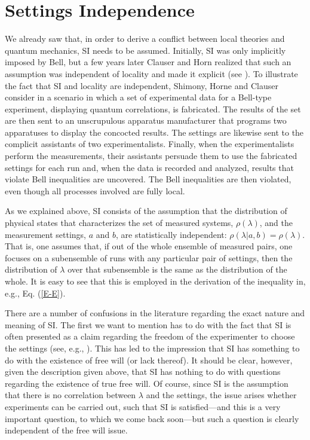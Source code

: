\documentclass[letterpaper,12pt]{article}
\begin{document}
\section{Settings Independence}
\label{SI}

We already saw that, in order to derive a conflict between local theories and quantum mechanics, SI needs to be assumed. Initially, SI was only implicitly imposed by Bell, but a few years later Clauser and Horn realized that such an assumption was independent of locality and made it explicit (see \cite[fn. 13]{CH74}). To illustrate the fact that SI and locality are independent, Shimony, Horne and Clauser consider in \cite{SHC} a scenario in which a set of experimental data for a Bell-type experiment, displaying quantum correlations, is fabricated. The results of the set are then sent to an unscrupulous apparatus manufacturer that programs two apparatuses to display the concocted results. The settings are likewise sent to the complicit assistants of two experimentalists. Finally, when the experimentalists perform the measurements, their assistants persuade them to use the fabricated settings for each run and, when the data is recorded and analyzed, results that violate Bell inequalities are uncovered. The Bell inequalities are then violated, even though all processes involved are fully local.

As we explained above, SI consists of the assumption that the distribution of physical states that characterizes the set of measured systems, $\rho(\lambda)$, and the measurement settings, $a$ and $b$, are statistically independent: $\rho(\lambda|a,b) = \rho(\lambda)$. That is, one assumes that, if out of the whole ensemble of measured pairs, one focuses on a subensemble of runs with any particular pair of settings, then the distribution of $\lambda$ over that subensemble is the same as the distribution of the whole. It is easy to see that this is employed in the derivation of the inequality in, e.g., Eq. (\ref{E-E}).

There are a number of confusions in the literature regarding the exact nature and meaning of SI. The first we want to mention has to do with the fact that SI is often presented as a claim regarding the freedom of the experimenter to choose the settings (see, e.g., \cite{Bell1976}). This has led to the impression that SI has something to do with the existence of free will (or lack thereof). It should be clear, however, given the description given above, that SI has nothing to do with questions regarding the existence of true free will. Of course, since SI is the assumption that there is no correlation between $\lambda$ and the settings, the issue arises whether experiments can be carried out, such that SI is satisfied---and this is a very important question, to which we come back soon---but such a question is clearly independent of the free will issue.
\end{document}
